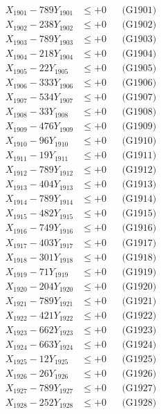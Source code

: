 \documentclass[a4paper,10pt]{article}
\begin{document}
{\begin{align}
\allowbreak
X_{1901} - 789Y_{1901} &\leq +0 && \text{(G1901)} \\
X_{1902} - 238Y_{1902} &\leq +0 && \text{(G1902)} \\
X_{1903} - 789Y_{1903} &\leq +0 && \text{(G1903)} \\
X_{1904} - 218Y_{1904} &\leq +0 && \text{(G1904)} \\
X_{1905} - 22Y_{1905} &\leq +0 && \text{(G1905)} \\
X_{1906} - 333Y_{1906} &\leq +0 && \text{(G1906)} \\
X_{1907} - 534Y_{1907} &\leq +0 && \text{(G1907)} \\
X_{1908} - 33Y_{1908} &\leq +0 && \text{(G1908)} \\
X_{1909} - 476Y_{1909} &\leq +0 && \text{(G1909)} \\
X_{1910} - 96Y_{1910} &\leq +0 && \text{(G1910)} \\
\allowbreak
X_{1911} - 19Y_{1911} &\leq +0 && \text{(G1911)} \\
X_{1912} - 789Y_{1912} &\leq +0 && \text{(G1912)} \\
X_{1913} - 404Y_{1913} &\leq +0 && \text{(G1913)} \\
X_{1914} - 789Y_{1914} &\leq +0 && \text{(G1914)} \\
X_{1915} - 482Y_{1915} &\leq +0 && \text{(G1915)} \\
X_{1916} - 749Y_{1916} &\leq +0 && \text{(G1916)} \\
X_{1917} - 403Y_{1917} &\leq +0 && \text{(G1917)} \\
X_{1918} - 301Y_{1918} &\leq +0 && \text{(G1918)} \\
X_{1919} - 71Y_{1919} &\leq +0 && \text{(G1919)} \\
X_{1920} - 204Y_{1920} &\leq +0 && \text{(G1920)} \\
\allowbreak
X_{1921} - 789Y_{1921} &\leq +0 && \text{(G1921)} \\
X_{1922} - 421Y_{1922} &\leq +0 && \text{(G1922)} \\
X_{1923} - 662Y_{1923} &\leq +0 && \text{(G1923)} \\
X_{1924} - 663Y_{1924} &\leq +0 && \text{(G1924)} \\
X_{1925} - 12Y_{1925} &\leq +0 && \text{(G1925)} \\
X_{1926} - 26Y_{1926} &\leq +0 && \text{(G1926)} \\
X_{1927} - 789Y_{1927} &\leq +0 && \text{(G1927)} \\
X_{1928} - 252Y_{1928} &\leq +0 && \text{(G1928)} \\

\end{align}}
\end{document}
